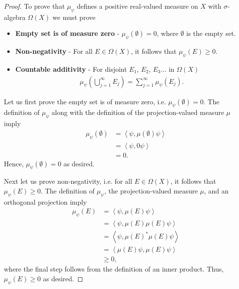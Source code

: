 \begin{proof}
    To prove that $\mu_\psi$ defines a positive real-valued measure on $X$ with $\sigma$-algebra $\Omega(X)$ we must prove
    \begin{itemize}
        \item \textbf{Empty set is of measure zero} - $\mu_\psi(\emptyset) = 0$, where $\emptyset$ is the empty set.
        \item \textbf{Non-negativity} - For all $E \in \Omega(X)$, it follows that $\mu_\psi(E) \ge 0$.
        \item \textbf{Countable additivity} - For disjoint $E_1$, $E_2$, $E_3$... in $\Omega(X)$ 
            \begin{align}
                \mu_\psi \left( \bigcup_{j = 1}^{\infty} E_j \right) = \sum_{j = 1}^{\infty} \mu_\psi(E_j).
            \end{align}
    \end{itemize}

    Let us first prove the empty set is of measure zero, i.e. $\mu_\psi(\emptyset) = 0$. The definition of $\mu_\psi$ along with the definition of the projection-valued measure $\mu$ imply
    \begin{align}
        \mu_\psi(\emptyset) &= \left< \psi, \mu(\emptyset) \psi \right> \\
                            &= \left< \psi, 0 \psi \right> \\
                            &= 0.
    \end{align}
    Hence, $\mu_\psi(\emptyset) = 0$ as desired.

    Next let us prove non-negativity, i.e. for all $E \in \Omega(X)$, it follows that $\mu_\psi(E) \ge 0$.  The definition of $\mu_\psi$, the projection-valued measure $\mu$, and an orthogonal projection imply
    \begin{align}
        \mu_\psi(E) &= \left< \psi, \mu(E) \psi \right> \\
                    &= \left< \psi, \mu(E) \mu(E) \psi \right>  \\
                    &= \left< \psi, \mu(E)^* \mu(E) \psi \right>  \\
                    &= \left< \mu(E) \psi, \mu(E) \psi \right>  \\
                    &\ge 0,
    \end{align}
    where the final step follows from the definition of an inner product. Thus, $\mu_\psi(E) \ge 0$ as desired.


\end{proof}
